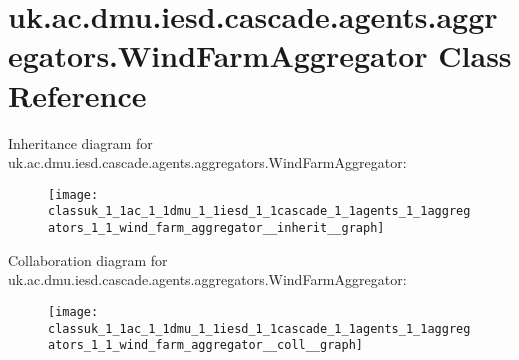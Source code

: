 \hypertarget{classuk_1_1ac_1_1dmu_1_1iesd_1_1cascade_1_1agents_1_1aggregators_1_1_wind_farm_aggregator}{\section{uk.\-ac.\-dmu.\-iesd.\-cascade.\-agents.\-aggregators.\-Wind\-Farm\-Aggregator Class Reference}
\label{classuk_1_1ac_1_1dmu_1_1iesd_1_1cascade_1_1agents_1_1aggregators_1_1_wind_farm_aggregator}
}


Inheritance diagram for uk.\-ac.\-dmu.\-iesd.\-cascade.\-agents.\-aggregators.\-Wind\-Farm\-Aggregator\-:\nopagebreak
\begin{figure}[H]
\begin{center}
\leavevmode
\texttt{[image: classuk\_1\_1ac\_1\_1dmu\_1\_1iesd\_1\_1cascade\_1\_1agents\_1\_1aggregators\_1\_1\_wind\_farm\_aggregator\_\_inherit\_\_graph]}
\end{center}
\end{figure}


Collaboration diagram for uk.\-ac.\-dmu.\-iesd.\-cascade.\-agents.\-aggregators.\-Wind\-Farm\-Aggregator\-:\nopagebreak
\begin{figure}[H]
\begin{center}
\leavevmode
\texttt{[image: classuk\_1\_1ac\_1\_1dmu\_1\_1iesd\_1\_1cascade\_1\_1agents\_1\_1aggregators\_1\_1\_wind\_farm\_aggregator\_\_coll\_\_graph]}
\end{center}
\end{figure}
